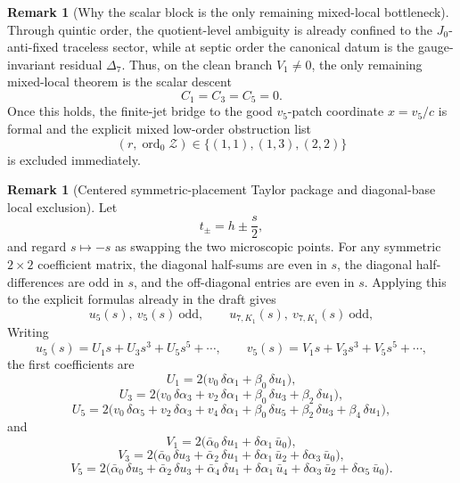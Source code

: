 \documentclass[11pt,a4paper]{amsart}
\theoremstyle{plain}
\theoremstyle{definition}
\newtheorem{remark}[theorem]{Remark}
\begin{document}
\begin{remark}[Why the scalar block is the only remaining mixed-local bottleneck]
\label{rem:scalar-block-only-remaining-mixed-local-bottleneck}
Through quintic order, the quotient-level ambiguity is already confined to the
$J_0$-anti-fixed traceless sector, while at septic order the canonical datum
is the gauge-invariant residual $\Delta_7$. Thus, on the clean branch
$V_1\neq 0$, the only remaining mixed-local theorem is the scalar descent
\[
C_1=C_3=C_5=0.
\]
Once this holds, the finite-jet bridge to the good $v_5$-patch coordinate
$x=v_5/c$ is formal and the explicit mixed low-order obstruction list
\[
(r,\operatorname{ord}_0\mathcal Z)\in\{(1,1),(1,3),(2,2)\}
\]
is excluded immediately.
\end{remark}

\begin{remark}[Centered symmetric-placement Taylor package and diagonal-base local exclusion]
\label{rem:centered-symmetric-placement-taylor-package}
Let
\[
t_\pm=h\pm \frac{s}{2},
\]
and regard $s\mapsto -s$ as swapping the two microscopic points. For any
symmetric $2\times 2$ coefficient matrix, the diagonal half-sums are even in
$s$, the diagonal half-differences are odd in $s$, and the off-diagonal
entries are even in $s$. Applying this to the explicit formulas already in the
draft gives
\[
u_5(s),\ v_5(s)\ \text{odd},
\qquad
u_{7,K_1}(s),\ v_{7,K_1}(s)\ \text{odd},
\]
Writing
\[
u_5(s)=U_1s+U_3s^3+U_5s^5+\cdots,
\qquad
v_5(s)=V_1s+V_3s^3+V_5s^5+\cdots,
\]
the first coefficients are
\[
U_1=2\bigl(v_0\,\delta\alpha_1+\beta_0\,\delta u_1\bigr),
\]
\[
U_3=2\bigl(v_0\,\delta\alpha_3+v_2\,\delta\alpha_1+\beta_0\,\delta u_3+\beta_2\,\delta u_1\bigr),
\]
\[
U_5=2\bigl(v_0\,\delta\alpha_5+v_2\,\delta\alpha_3+v_4\,\delta\alpha_1+\beta_0\,\delta u_5+\beta_2\,\delta u_3+\beta_4\,\delta u_1\bigr),
\]
and
\[
V_1=2\bigl(\bar\alpha_0\,\delta u_1+\delta\alpha_1\,\bar u_0\bigr),
\]
\[
V_3=2\bigl(\bar\alpha_0\,\delta u_3+\bar\alpha_2\,\delta u_1+\delta\alpha_1\,\bar u_2+\delta\alpha_3\,\bar u_0\bigr),
\]
\[
V_5=2\bigl(\bar\alpha_0\,\delta u_5+\bar\alpha_2\,\delta u_3+\bar\alpha_4\,\delta u_1+\delta\alpha_1\,\bar u_4+\delta\alpha_3\,\bar u_2+\delta\alpha_5\,\bar u_0\bigr).
\]


\end{remark}
\end{document}
